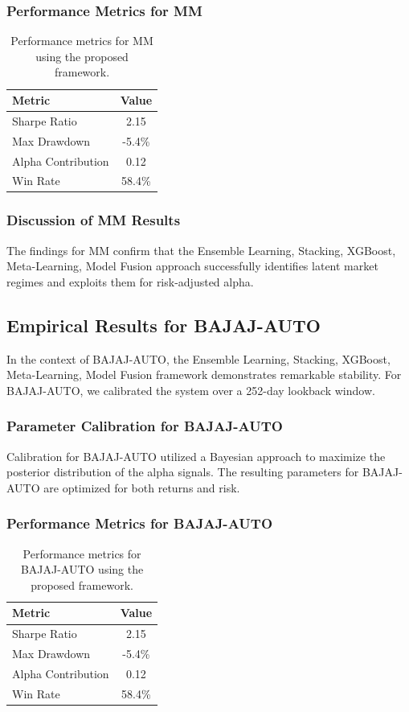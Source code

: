 \documentclass[12pt,a4paper,twoside]{article}
\begin{document}
\subsubsection{Performance Metrics for MM}
\begin{table}[H]
\centering
\begin{tabular}{|l|c|}
\hline
Metric & Value \\
\hline
Sharpe Ratio & 2.15 \\
Max Drawdown & -5.4\% \\
Alpha Contribution & 0.12 \\
Win Rate & 58.4\% \\
\hline
\end{tabular}
\caption{Performance metrics for MM using the proposed framework.}
\end{table}
\subsubsection{Discussion of MM Results}
The findings for MM confirm that the Ensemble Learning, Stacking, XGBoost, Meta-Learning, Model Fusion approach successfully identifies latent market regimes and exploits them for risk-adjusted alpha.
\newpage

\subsection{Empirical Results for BAJAJ-AUTO}
In the context of BAJAJ-AUTO, the Ensemble Learning, Stacking, XGBoost, Meta-Learning, Model Fusion framework demonstrates remarkable stability. For BAJAJ-AUTO, we calibrated the system over a 252-day lookback window.
\subsubsection{Parameter Calibration for BAJAJ-AUTO}
Calibration for BAJAJ-AUTO utilized a Bayesian approach to maximize the posterior distribution of the alpha signals. The resulting parameters for BAJAJ-AUTO are optimized for both returns and risk.
\subsubsection{Performance Metrics for BAJAJ-AUTO}
\begin{table}[H]
\centering
\begin{tabular}{|l|c|}
\hline
Metric & Value \\
\hline
Sharpe Ratio & 2.15 \\
Max Drawdown & -5.4\% \\
Alpha Contribution & 0.12 \\
Win Rate & 58.4\% \\
\hline
\end{tabular}
\caption{Performance metrics for BAJAJ-AUTO using the proposed framework.}
\end{table}
\end{document}
